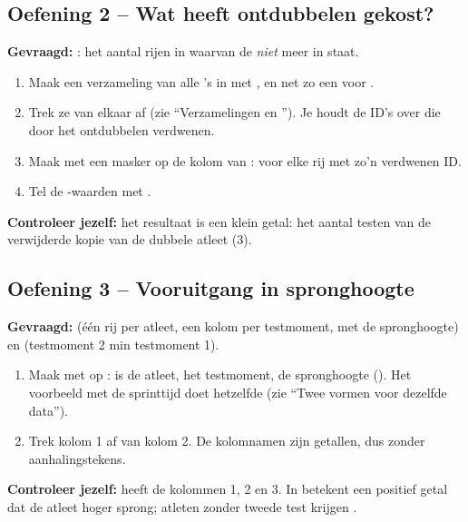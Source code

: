 \documentclass[11pt,a4paper]{article}
\begin{document}
\subsection*{Oefening 2 -- Wat heeft ontdubbelen gekost?}

\textbf{Gevraagd:} : het aantal rijen in
 waarvan de  \emph{niet} meer in
 staat.

\begin{enumerate}
  \item Maak een verzameling van alle 's in
         met , en net zo een voor
        .
  \item Trek ze van elkaar af (zie ``Verzamelingen en ''). Je
        houdt de ID's over die door het ontdubbelen verdwenen.
  \item Maak met  een masker op de kolom
         van :  voor elke
        rij met zo'n verdwenen ID.
  \item Tel de -waarden met .
\end{enumerate}

\textbf{Controleer jezelf:} het resultaat is een klein getal: het aantal
testen van de verwijderde kopie van de dubbele atleet (3).

\subsection*{Oefening 3 -- Vooruitgang in spronghoogte}

\textbf{Gevraagd:}  (één rij per atleet, een kolom per
testmoment, met de spronghoogte) en 
(testmoment 2 min testmoment 1).

\begin{enumerate}
  \item Maak  met  op
        :  is de atleet,  het
        testmoment,  de spronghoogte
        (). Het voorbeeld met de sprinttijd doet
        hetzelfde (zie ``Twee vormen voor dezelfde data'').
  \item Trek kolom 1 af van kolom 2. De kolomnamen zijn getallen, dus
        zonder aanhalingstekens.
\end{enumerate}

\textbf{Controleer jezelf:}  heeft de kolommen 1, 2 en 3.
In  betekent een positief getal dat de
atleet hoger sprong; atleten zonder tweede test krijgen .
\end{document}
